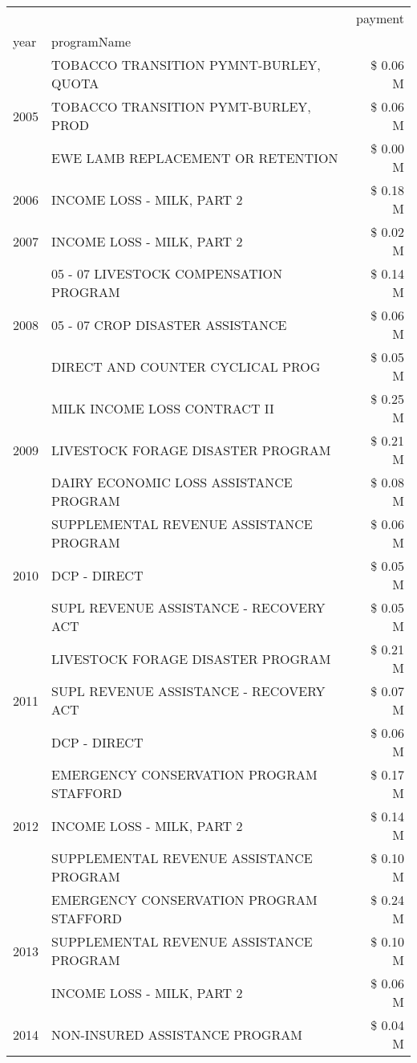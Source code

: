 \begin{tabular}{llr}
\toprule
 &  & payment \\
year & programName &  \\
\midrule
\multirow[t]{3}{*}{2005} & TOBACCO TRANSITION PYMNT-BURLEY, QUOTA & \$ 0.06 M \\
 & TOBACCO TRANSITION PYMT-BURLEY, PROD & \$ 0.06 M \\
 & EWE LAMB REPLACEMENT OR RETENTION & \$ 0.00 M \\
\cline{1-3}
2006 & INCOME LOSS - MILK, PART 2 & \$ 0.18 M \\
\cline{1-3}
2007 & INCOME LOSS - MILK, PART 2 & \$ 0.02 M \\
\cline{1-3}
\multirow[t]{3}{*}{2008} & 05 - 07 LIVESTOCK COMPENSATION PROGRAM & \$ 0.14 M \\
 & 05 - 07 CROP DISASTER ASSISTANCE & \$ 0.06 M \\
 & DIRECT AND COUNTER CYCLICAL PROG & \$ 0.05 M \\
\cline{1-3}
\multirow[t]{3}{*}{2009} & MILK INCOME LOSS CONTRACT II & \$ 0.25 M \\
 & LIVESTOCK FORAGE DISASTER  PROGRAM & \$ 0.21 M \\
 & DAIRY ECONOMIC LOSS ASSISTANCE PROGRAM & \$ 0.08 M \\
\cline{1-3}
\multirow[t]{3}{*}{2010} & SUPPLEMENTAL REVENUE ASSISTANCE PROGRAM & \$ 0.06 M \\
 & DCP - DIRECT & \$ 0.05 M \\
 & SUPL REVENUE ASSISTANCE - RECOVERY ACT & \$ 0.05 M \\
\cline{1-3}
\multirow[t]{3}{*}{2011} & LIVESTOCK FORAGE DISASTER PROGRAM & \$ 0.21 M \\
 & SUPL REVENUE ASSISTANCE - RECOVERY ACT & \$ 0.07 M \\
 & DCP - DIRECT & \$ 0.06 M \\
\cline{1-3}
\multirow[t]{3}{*}{2012} & EMERGENCY CONSERVATION PROGRAM STAFFORD & \$ 0.17 M \\
 & INCOME LOSS - MILK, PART 2 & \$ 0.14 M \\
 & SUPPLEMENTAL REVENUE ASSISTANCE PROGRAM & \$ 0.10 M \\
\cline{1-3}
\multirow[t]{3}{*}{2013} & EMERGENCY CONSERVATION PROGRAM STAFFORD & \$ 0.24 M \\
 & SUPPLEMENTAL REVENUE ASSISTANCE PROGRAM & \$ 0.10 M \\
 & INCOME LOSS - MILK, PART 2 & \$ 0.06 M \\
\cline{1-3}
\multirow[t]{3}{*}{2014} & NON-INSURED ASSISTANCE PROGRAM & \$ 0.04 M \\

\end{tabular}
